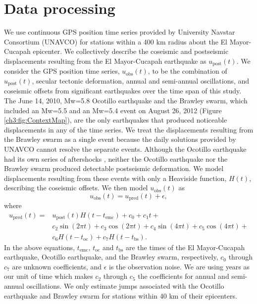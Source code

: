 \section{Data processing}\label{ch3:sec:Data}
We use continuous GPS position time series provided by University
Navstar Consortium (UNAVCO) for stations within a 400 km radius about
the El Mayor-Cucapah epicenter. We collectively describe the coseismic
and postseismic displacements resulting from the El Mayor-Cucapah
earthquake as $u_\mathrm{post}(t)$.  We consider the GPS position time
series, $u_\mathrm{obs}(t)$, to be the combination of
$u_\mathrm{post}(t)$, secular tectonic deformation, annual and
semi-annual oscillations, and coseismic offsets from significant
earthquakes over the time span of this study.  The June 14, 2010,
Mw=5.8 Ocotillo earthquake and the Brawley swarm, which included an
Mw=5.5 and an Mw=5.4 event on August 26, 2012 (Figure
\ref{ch3:fig:ContextMap}), are the only earthquakes that produced
noticeable displacements in any of the time series.  We treat the
displacements resulting from the Brawley swarm as a single event
because the daily solutions provided by UNAVCO cannot resolve the
separate events.  Although the Ocotillo earthquake had its own series
of aftershocks \citep{Hauksson2011}, neither the Ocotillo earthquake
nor the Brawley swarm produced detectable postseismic deformation.  We
model displacements resulting from these events with only a Heaviside
function, $H(t)$, describing the coseismic offsets.  We then model
$u_\mathrm{obs}(t)$ as
\begin{equation}
  u_\mathrm{obs}(t) = u_\mathrm{pred}(t) + \epsilon,
\end{equation}
where
\begin{equation}\label{TimeSeriesModel}
  \begin{split}  
    u_\mathrm{pred}(t) = &u_\mathrm{post}(t)H(t-t_\mathrm{emc}) + c_0 + c_1t + \\
                         &c_2\sin(2\pi t) + c_3\cos(2\pi t) + c_4\sin(4\pi t) + c_5\cos(4\pi t) + \\
                         &c_6H(t-t_\mathrm{oc}) + c_7H(t-t_\mathrm{bs}).
  \end{split}
\end{equation}
In the above equations, $t_\mathrm{emc}$, $t_\mathrm{oc}$ and
$t_\mathrm{bs}$ are the times of the El Mayor-Cucapah earthquake,
Ocotillo earthquake, and the Brawley swarm, respectively, $c_0$
through $c_7$ are unknown coefficients, and $\epsilon$ is the
observation noise.  We are using years as our unit of time which makes
$c_2$ through $c_5$ the coefficients for annual and semi-annual
oscillations.  We only estimate jumps associated with the Ocotillo
earthquake and Brawley swarm for stations within 40 km of their
epicenters.

